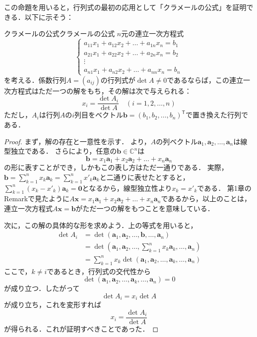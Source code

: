 この命題を用いると，行列式の最初の応用として「クラメールの公式」を証明できる．以下に示そう：


\begin{prop}{クラメールの公式}{クラメールの公式}
  $n$元の連立一次方程式
  \[
  \begin{cases}
    a_{11} x_1 + a_{12} x_2 + \dots + a_{1n} x_n = b_1 \\
    a_{21} x_1 + a_{22} x_2 + \dots + a_{2n} x_n = b_2 \\
    \vdots \\
    a_{n1} x_1 + a_{n2} x_2 + \dots + a_{nn} x_n = b_n
  \end{cases}
  \]
  を考える．係数行列$A = (a_{ij})$の行列式が$\det A \ne 0$であるならば，この連立一次方程式はただ一つの解をもち，その解は次で与えられる：
  \[
  x_i = \frac{\det A_i}{\det A} \quad (i=1, 2, \dots, n)
  \]
  ただし，$A_i$は行列$A$の$i$列目をベクトル$\bm{b} = (b_1, b_2, \dots, b_n)^\mathsf{T}$で置き換えた行列である．
\end{prop}

\begin{leftbar}
\begin{proof}
  まず，解の存在と一意性を示す．
  より，$A$の列ベクトル$\bm{a}_1, \bm{a}_2, \dots, \bm{a}_n$は線型独立である．
  さらにより，任意の$\bm{b} \in \mathbb{C}^n$は
  \[
   \bm{b}= x_1 \bm{a}_1+x_2 \bm{a}_2+\dots + x_n \bm{a}_n
  \]
  の形に表すことができ，しかもこの表し方はただ一通りである．
  実際，$\bm{b} = \sum_{k=1}^{n} x_k \bm{a}_k = \sum_{k=1}^{n} x'_k \bm{a}_k$と二通りに表せたとすると，$\sum_{k=1}^{n} (x_k - x'_k) \bm{a}_k = \bm{0}$となるから，線型独立性より$x_k = x'_k$である．
  第1章のRemarkで見たように$A\bm{x} = x_1 \bm{a}_1 + x_2 \bm{a}_2 + \dots + x_n \bm{a}_n$であるから，以上のことは，連立一次方程式$A\bm{x} = \bm{b}$がただ一つの解をもつことを意味している．

  次に，この解の具体的な形を求めよう．上の等式を用いると，
  \begin{align*}
  \det A_i & = \det (\bm{a}_1,\bm{a}_2,\dots,\bm{b},\dots,\bm{a}_n) \\
  & = \det (\bm{a}_1,\bm{a}_2,\dots, \sum_{k=1}^n x_k \bm{a}_k ,\dots,\bm{a}_n) \\
  & = \sum_{k=1}^n x_k \det (\bm{a}_1,\bm{a}_2,\dots, \bm{a}_k ,\dots,\bm{a}_n) 
  \end{align*}
  ここで，$k \ne i$であるとき，行列式の交代性から
  \[
  \det (\bm{a}_1,\bm{a}_2,\dots, \bm{a}_k ,\dots,\bm{a}_n) = 0
  \]
  が成り立つ．したがって
  \[
  \det A_i = x_i \det A
  \]
  が成り立ち，これを変形すれば
  \[
  x_i = \frac{\det A_i}{\det A}
  \]
  が得られる．これが証明すべきことであった．
\end{proof}
\end{leftbar}

